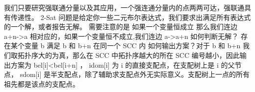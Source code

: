 {}
\markdownRendererSectionEnd 
\markdownRendererSectionEnd \markdownRendererSectionBegin
{}\markdownRendererInterblockSeparator
{}\markdownRendererSectionBegin
{}\markdownRendererInterblockSeparator
{}我们只要研究强联通分量以及其应用，一个强连通分量内的点两两可达，强联通具有传递性。\markdownRendererInterblockSeparator
{}\markdownRendererSectionBegin
{}\markdownRendererInterblockSeparator
{}\markdownRendererInterblockSeparator
{}
\markdownRendererSectionEnd \markdownRendererSectionBegin
{}\markdownRendererInterblockSeparator
{}\markdownRendererDollarSign{} 2-Sat \markdownRendererDollarSign{}问题是给定你一些二元布尔表达式，我们要求出满足所有表达式的一个解，或者报告无解。\markdownRendererParagraphSeparator
{}需要注意的是 如果一个变量恒成立 那么我们连边\markdownRendererDollarSign{} a+n->a \markdownRendererDollarSign{}\markdownRendererParagraphSeparator
{}相对应的，如果一个变量恒不成立,我们连边 \markdownRendererDollarSign{} a->a+n \markdownRendererDollarSign{}\markdownRendererParagraphSeparator
{}如何判断无解？ 存在某个变量\markdownRendererDollarSign{} b \markdownRendererDollarSign{}满足\markdownRendererDollarSign{} b \markdownRendererDollarSign{}和\markdownRendererDollarSign{} b+n \markdownRendererDollarSign{}在同一个\markdownRendererDollarSign{} SCC \markdownRendererDollarSign{}内\markdownRendererParagraphSeparator
{}如何输出方案？对于\markdownRendererDollarSign{} b \markdownRendererDollarSign{}和\markdownRendererDollarSign{} b+n \markdownRendererDollarSign{}我们取拓扑序大的为真，那么在\markdownRendererDollarSign{} SCC \markdownRendererDollarSign{}中拓扑序越大的所在\markdownRendererDollarSign{} SCC \markdownRendererDollarSign{}编号越小，因此输出方案为\markdownRendererDollarSign{} bel[i]<bel[i+n] \markdownRendererDollarSign{}，\markdownRendererInterblockSeparator
{}
\markdownRendererSectionEnd \markdownRendererSectionBegin
{}\markdownRendererInterblockSeparator
{}\markdownRendererDollarSign{} idom[i] \markdownRendererDollarSign{}为\markdownRendererDollarSign{} i \markdownRendererDollarSign{}的直接支配点，在支配树上是\markdownRendererDollarSign{} i \markdownRendererDollarSign{}的父节点，\markdownRendererDollarSign{} sdom[i] \markdownRendererDollarSign{}是半支配点，除了辅助求支配点外无实际意义。支配树上一点的所有祖先都是该点的支配点。\markdownRendererInterblockSeparator
{}\markdownRendererInterblockSeparator
